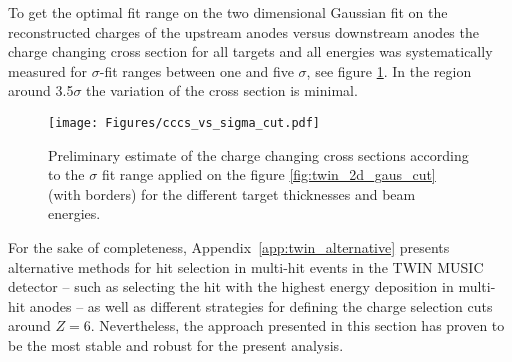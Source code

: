 
To get the optimal fit range on the two dimensional Gaussian fit on the reconstructed charges of the upstream anodes versus downstream anodes the charge changing cross section for all targets and all energies was systematically measured for $\sigma$-fit ranges between one and five $\sigma$, see figure \ref{fig:cccs_vs_sigma_cut}. In the region around 3.5$\sigma$ the variation of the cross section is minimal.\newline
\begin{figure}[htpb]
    \centering
    \texttt{[image: Figures/cccs\_vs\_sigma\_cut.pdf]}
    \caption{
    Preliminary estimate of the charge changing cross sections according to the $\sigma$ fit range applied on the figure \ref{fig:twin_2d_gaus_cut} (with borders) for the different target thicknesses and beam energies.
     }
    \label{fig:cccs_vs_sigma_cut}
\end{figure}

For the sake of completeness, Appendix~\ref{app:twin_alternative} presents alternative methods for hit selection in multi-hit events in the TWIN MUSIC detector -- such as selecting the hit with the highest energy deposition in multi-hit anodes -- as well as different strategies for defining the charge selection cuts around $Z = 6$. Nevertheless, the approach presented in this section has proven to be the most stable and robust for the present analysis.

